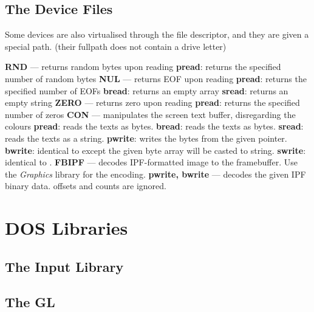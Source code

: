 \section{The Device Files}

Some devices are also virtualised through the file descriptor, and they are given a special path. (their fullpath does not contain a drive letter)

\begin{outline}
\1\textbf{RND} --- returns random bytes upon reading
 \2\textbf{pread}: returns the specified number of random bytes
\1\textbf{NUL} --- returns EOF upon reading
 \2\textbf{pread}: returns the specified number of EOFs
 \2\textbf{bread}: returns an empty array
 \2\textbf{sread}: returns an empty string
\1\textbf{ZERO} --- returns zero upon reading
 \2\textbf{pread}: returns the specified number of zeros
\1\textbf{CON} --- manipulates the screen text buffer, disregarding the colours
 \2\textbf{pread}: reads the texts as bytes.
 \2\textbf{bread}: reads the texts as bytes.
 \2\textbf{sread}: reads the texts as a string.
 \2\textbf{pwrite}: writes the bytes from the given pointer.
 \2\textbf{bwrite}: identical to  except the given byte array will be casted to string.
 \2\textbf{swrite}: identical to .
\1\textbf{FBIPF} --- decodes IPF-formatted image to the framebuffer. Use the \emph{Graphics} library for the encoding.
 \2\textbf{pwrite, bwrite} --- decodes the given IPF binary data.  offsets and counts are ignored.

\end{outline}


\chapter{DOS Libraries}


\section{The Input Library}


\begin{outline}
\end{outline}



\section{The GL}


\begin{outline}
\end{outline}
